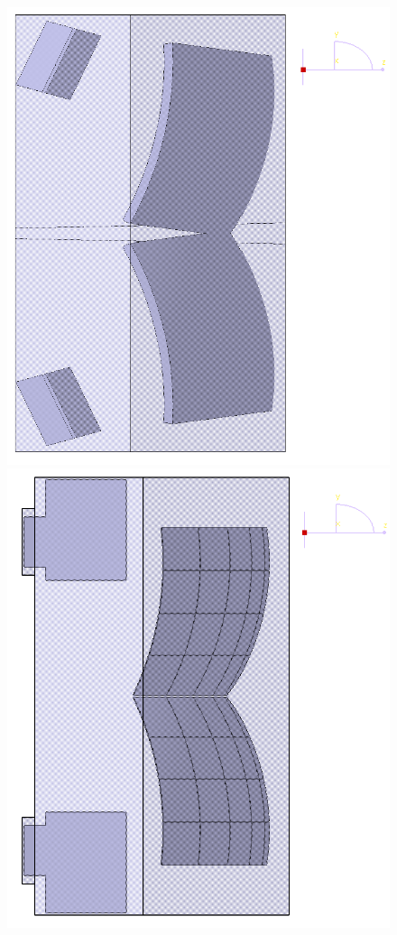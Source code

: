 \begin{figure}[H]
\begin{minipage}[b]{0.49\textwidth}
\includegraphics[width=1.0\textwidth]{pictures/RICH_MC_evolution_before.png}
\end{minipage}
\hspace{0.01\textwidth}
\begin{minipage}[b]{0.49\textwidth}
\includegraphics[width=1.0\textwidth]{pictures/RICH_MC_evolution_after.png}

\end{minipage}
\end{figure}

